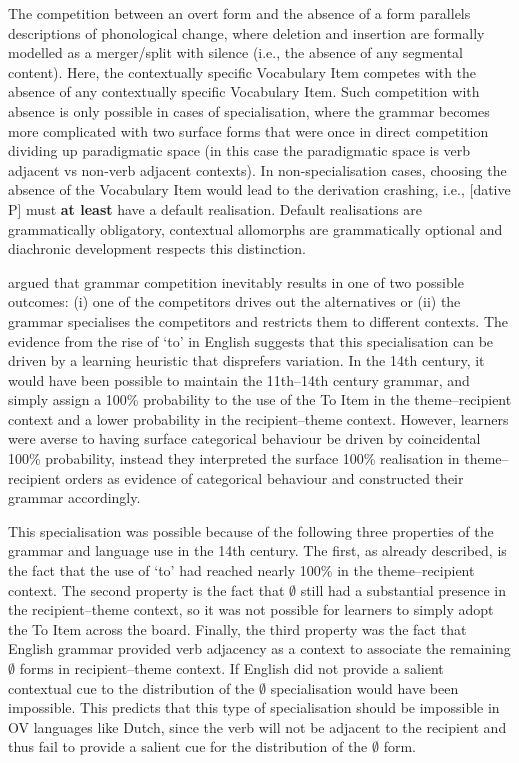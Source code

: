 	The competition between an overt form and the absence of a form parallels descriptions of phonological change, where deletion and insertion are formally modelled as a merger/split with silence (i.e., the absence of any segmental content). Here, the contextually specific Vocabulary Item competes with the absence of any contextually specific Vocabulary Item. Such competition with absence is only possible in cases of specialisation, where the grammar becomes more complicated with two surface forms that were once in direct competition dividing up paradigmatic space (in this case the paradigmatic space is verb adjacent vs non-verb adjacent contexts). In non-specialisation cases, choosing the absence of the Vocabulary Item would lead to the derivation crashing, i.e., [dative P] must \textbf{at least} have a default realisation. Default realisations are grammatically obligatory, contextual allomorphs are grammatically optional and diachronic development respects this distinction.

	\cite{Wallenberg.2013} argued that grammar competition inevitably results in one of two possible outcomes: (i) one of the competitors drives out the alternatives or (ii) the grammar specialises the competitors and restricts them to different contexts. The evidence from the rise of `to' in English suggests that this specialisation can be driven by a learning heuristic that disprefers variation. In the 14th century, it would have been possible to maintain the 11th--14th century grammar, and simply assign a 100\% probability to the use of the To Item in the theme--recipient context and a lower probability in the recipient--theme context. However, learners were averse to having surface categorical behaviour be driven by coincidental 100\% probability, instead they interpreted the surface 100\% realisation in theme--recipient orders as evidence of categorical behaviour and constructed their grammar accordingly.

	This specialisation was possible because of the following three properties of the grammar and language use in the 14th century. The first, as already described, is the fact that the use of `to' had reached nearly 100\% in the theme--recipient context. The second property is the fact that $\emptyset$ still had a substantial presence in the recipient--theme context, so it was not possible for learners to simply adopt the To Item across the board. Finally, the third property was the fact that English grammar provided verb adjacency as a context to associate the remaining $\emptyset$ forms in recipient--theme context. If English did not provide a salient contextual cue to the distribution of the $\emptyset$ specialisation would have been impossible. This predicts that this type of specialisation should be impossible in OV languages like Dutch, since the verb will not be adjacent to the recipient and thus fail to provide a salient cue for the distribution of the $\emptyset$ form. 

